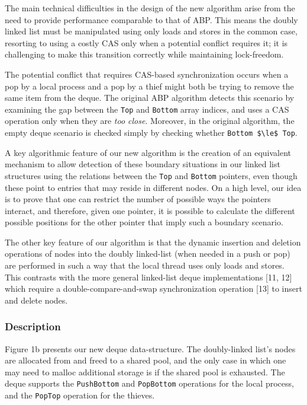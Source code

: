 The main technical difficulties in the design of the new algorithm
arise from the need to provide performance comparable to that of
ABP. This means the doubly linked list must be manipulated using only
loads and stores in the common case, resorting to using a costly CAS
only when a potential conflict requires it; it is challenging to make
this transition correctly while maintaining lock-freedom.

The potential conflict that requires CAS-based synchronization occurs
when a pop by a local process and a pop by a thief might both be
trying to remove the same item from the deque. The original ABP
algorithm detects this scenario by examining the gap between the
\lstinline!Top! and \lstinline!Bottom! array indices, and uses a CAS
operation only when they are \emph{too close}. Moreover, in the original
algorithm, the empty deque scenario is checked simply by checking
whether \lstinline!Bottom $\le$ Top!.

A key algorithmic feature of our new algorithm is the creation of an
equivalent mechanism to allow detection of these boundary situations
in our linked list structures using the relations between the
\lstinline!Top! and \lstinline!Bottom! pointers, even though these
point to entries that may reside in different nodes. On a high level,
our idea is to prove that one can restrict the number of possible ways
the pointers interact, and therefore, given one pointer, it is
possible to calculate the different possible positions for the other
pointer that imply such a boundary scenario.

The other key feature of our algorithm is that the dynamic insertion
and deletion operations of nodes into the doubly linked-list (when
needed in a push or pop) are performed in such a way that the local
thread uses only loads and stores. This contrasts with the more
general linked-list deque implementations [11, 12] which require a
double-compare-and-swap synchronization operation [13] to insert and
delete nodes.

\subsubsection{Description}

Figure 1b presents our new deque data-structure. The doubly-linked
list's nodes are allocated from and freed to a shared pool, and the
only case in which one may need to malloc additional storage is if the
shared pool is exhausted. The deque supports the
\lstinline!PushBottom! and \lstinline!PopBottom! operations for the
local process, and the \lstinline!PopTop! operation for the thieves.

